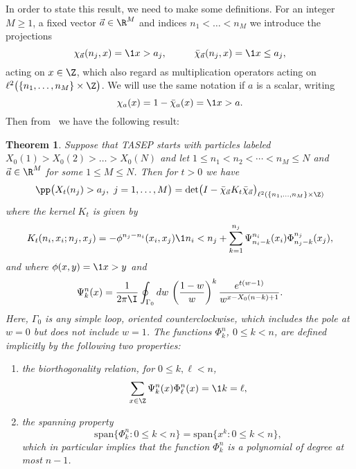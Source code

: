 \documentclass[]{pcmi}
\theoremstyle{plain}
\newtheorem{theorem}[equation]{Theorem}
\theoremstyle{definition}
\begin{document}
In order to state this result, we need to make some definitions. For an integer $M \geq 1$, a fixed vector $\vec a \in\R^M$ and indices $n_1<\ldots<n_M$ we introduce the projections
\begin{equation}\label{eq:defChis}
\chi_{\vec a}(n_j,x)=\1{x> a_j}, \hspace{1cm} \bar\chi_{\vec a}(n_j,x)=\1{x\leq a_j},
\end{equation}
acting on $x \in \Z$, which also regard as multiplication operators acting on $\ell^2 \bigl(\{n_1,\ldots,n_M\}\times\Z\bigr)$.
We will use the same notation if $a$ is a scalar, writing 
\begin{equation}\label{eq:defChisScalar}
\chi_a(x)=1-\bar\chi_a(x)=\1{x>a}.
\end{equation}
Then from~\cite{borFerPrahSasam} we have the following result:

\begin{theorem}\label{thm:BFPS}
Suppose that TASEP starts with particles labeled $X_0(1)>X_0(2)>\ldots >X_0(N)$ and let $1\leq n_1<n_2<\dotsm<n_M\leq N$ and $\vec a \in\R^M$ for some $1\leq M \leq N$. Then for $t>0$ we have
\begin{equation}\label{eq:extKernelProbBFPS}
	\pp \bigl(X_t(n_j) > a_j,~j=1,\ldots,M\bigr)=\det \bigl(I-\bar\chi_{\vec a}K_t\bar\chi_{\vec a}\bigr)_{\ell^2(\{n_1,\ldots,n_M\}\times\Z)}
\end{equation}
where the kernel $K_t$ is given by
\begin{equation}\label{eq:Kt}
K_t(n_i,x_i;n_j,x_j)=-\phi^{n_j - n_i}(x_i,x_j)\1{n_i<n_j}+\sum_{k=1}^{n_j}\Psi^{n_i}_{n_i-k}(x_i)\Phi^{n_j}_{n_j-k}(x_j),
\end{equation}
and where $\phi(x,y)=\1{x>y}$ and
\begin{equation}\label{eq:defPsi}
\Psi^n_k(x)=\frac1{2\pi\I}\oint_{\Gamma_0}dw\,\left(\frac{1-w}{w}\right)^{k} \frac{e^{t(w-1)}}{w^{x - X_0(n-k) + 1}}.
\end{equation}
Here, $\Gamma_0$ is any simple loop, oriented counterclockwise, which includes the pole at $w=0$ but does not include $w=1$.
The functions $\Phi_k^{n}$, $0 \leq k < n$, are defined implicitly by the following two properties:
\begin{enumerate}[label={\normalfont (\arabic{*})}]
\item the biorthogonality relation, for $0 \leq k, \ell < n$,
\[
 \sum_{x\in\Z}\Psi_k^{n}(x)\Phi_\ell^{n}(x)=\1{k=\ell},
\]
\label{ortho}
\item   the spanning property 
\[
 {\mathrm{span}} \bigl\{\Phi^n_k : 0 \leq k < n\bigr\} = {\mathrm{span}}\bigl\{x^k : 0 \leq k < n\bigr\},
\]
which in particular implies that the function $\Phi^n_k$ is a polynomial of degree at most $n-1$.
\end{enumerate} 
\end{theorem}
\end{document}
